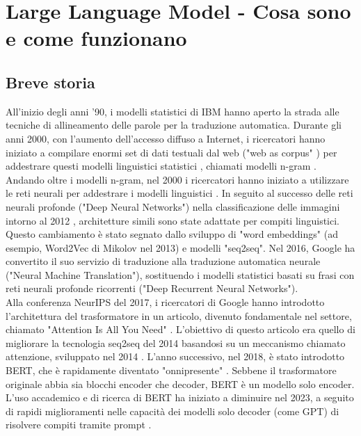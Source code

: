 \chapter{Large Language Model - Cosa sono e come funzionano}

\section{Breve storia}

All'inizio degli anni '90, i modelli statistici di IBM hanno aperto la strada alle tecniche di allineamento delle parole per la traduzione automatica. Durante gli anni 2000, con l'aumento dell'accesso diffuso a Internet, i ricercatori hanno iniziato a compilare enormi set di dati testuali dal web ("web as corpus" \cite{kilgarriff2003webascorpus}) per addestrare questi modelli linguistici statistici \cite{banko2001scaling}\cite{resnik2003webparallel}, chiamati modelli n-gram \cite{goodman2001progress}. \\
Andando oltre i modelli n-gram, nel 2000 i ricercatori hanno iniziato a utilizzare le reti neurali per addestrare i modelli linguistici \cite{xu2000annlm}. In seguito al successo delle reti neurali profonde ("Deep Neural Networks") nella classificazione delle immagini intorno al 2012 \cite{chen2021cnnreview}, architetture simili sono state adattate per compiti linguistici. Questo cambiamento è stato segnato dallo sviluppo di "word embeddings" (ad esempio, Word2Vec di Mikolov nel 2013) e modelli "seq2seq". Nel 2016, Google ha convertito il suo servizio di traduzione alla traduzione automatica neurale ("Neural Machine Translation"), sostituendo i modelli statistici basati su frasi con reti neurali profonde ricorrenti ("Deep Recurrent Neural Networks"). \\
Alla conferenza NeurIPS del 2017, i ricercatori di Google hanno introdotto l'architettura del trasformatore in un articolo, divenuto fondamentale nel settore, chiamato "Attention Is All You Need" \cite{vaswani2017attention}. L'obiettivo di questo articolo era quello di migliorare la tecnologia seq2seq del 2014 basandosi su un meccanismo chiamato attenzione, sviluppato nel 2014 \cite{bahdanau2014nmt}. L'anno successivo, nel 2018, è stato introdotto BERT, che è rapidamente diventato "onnipresente" \cite{rogers2020bertology}. Sebbene il trasformatore originale abbia sia blocchi encoder che decoder, BERT è un modello solo encoder. L'uso accademico e di ricerca di BERT ha iniziato a diminuire nel 2023, a seguito di rapidi miglioramenti nelle capacità dei modelli solo decoder (come GPT) di risolvere compiti tramite prompt \cite{movva2024topics}. \\
